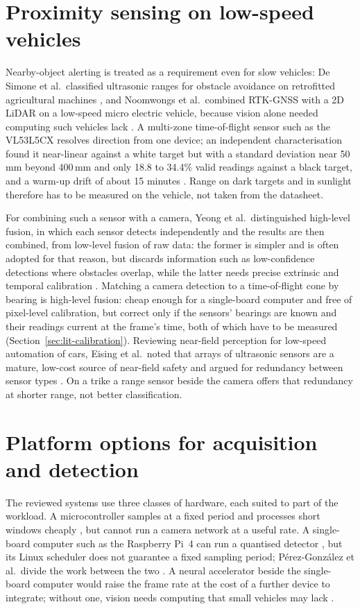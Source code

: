\section{Proximity sensing on low-speed vehicles}
\label{sec:lit-proximity}

Nearby-object alerting is treated as a requirement even for slow vehicles: De Simone et al.\ classified ultrasonic ranges for obstacle avoidance on retrofitted agricultural machines \cite{desimone2018}, and Noomwongs et al.\ combined RTK-GNSS with a 2D LiDAR on a low-speed micro electric vehicle, because vision alone needed computing such vehicles lack \cite{noomwongs2025}. A multi-zone time-of-flight sensor such as the VL53L5CX resolves direction from one device; an independent characterisation found it near-linear against a white target but with a standard deviation near 50\,mm beyond 400\,mm and only 18.8 to 34.4\% valid readings against a black target, and a warm-up drift of about 15 minutes \cite{caroleo2026}. Range on dark targets and in sunlight therefore has to be measured on the vehicle, not taken from the datasheet.

For combining such a sensor with a camera, Yeong et al.\ distinguished high-level fusion, in which each sensor detects independently and the results are then combined, from low-level fusion of raw data: the former is simpler and is often adopted for that reason, but discards information such as low-confidence detections where obstacles overlap, while the latter needs precise extrinsic and temporal calibration \cite{yeong2021}. Matching a camera detection to a time-of-flight cone by bearing is high-level fusion: cheap enough for a single-board computer and free of pixel-level calibration, but correct only if the sensors' bearings are known and their readings current at the frame's time, both of which have to be measured (Section~\ref{sec:lit-calibration}). Reviewing near-field perception for low-speed automation of cars, Eising et al.\ noted that arrays of ultrasonic sensors are a mature, low-cost source of near-field safety and argued for redundancy between sensor types \cite{eising2022}. On a trike a range sensor beside the camera offers that redundancy at shorter range, not better classification.

\section{Platform options for acquisition and detection}
\label{sec:lit-platforms}

The reviewed systems use three classes of hardware, each suited to part of the workload. A microcontroller samples at a fixed period and processes short windows cheaply \cite{bui2026, alatoom2025}, but cannot run a camera network at a useful rate. A single-board computer such as the Raspberry Pi~4 can run a quantised detector \cite{jacob2018quantization, alqahtani2024edge}, but its Linux scheduler does not guarantee a fixed sampling period; P\'erez-Gonz\'alez et al.\ divide the work between the two \cite{perezgonzalez2025}. A neural accelerator beside the single-board computer would raise the frame rate at the cost of a further device to integrate; without one, vision needs computing that small vehicles may lack \cite{noomwongs2025}.

